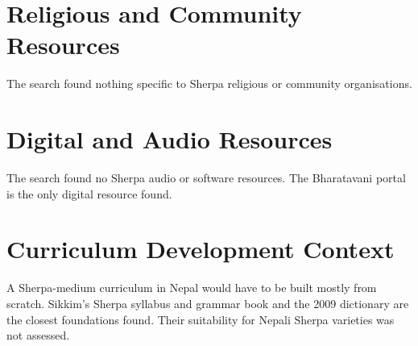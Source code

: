 \documentclass[12pt]{article}
\begin{document}
\section{Religious and Community Resources}
The search found nothing specific to Sherpa religious or community organisations.

\section{Digital and Audio Resources}
The search found no Sherpa audio or software resources. The Bharatavani portal is the only digital resource found.

\section{Curriculum Development Context}
A Sherpa-medium curriculum in Nepal would have to be built mostly from scratch. Sikkim's Sherpa syllabus and grammar book and the 2009 dictionary are the closest foundations found. Their suitability for Nepali Sherpa varieties was not assessed.
\end{document}
